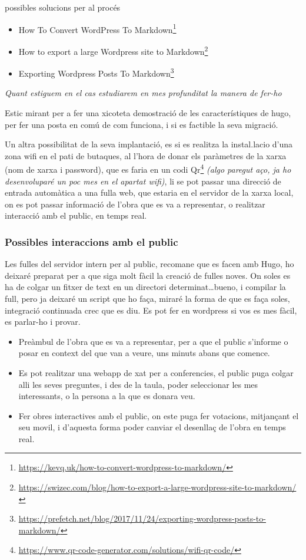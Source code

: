 \documentclass[
  10pt,
]{krantz}
\DeclareRobustCommand{\href}[2]{#2\footnote{\url{#1}}}
\providecommand{\tightlist}{%
  \setlength{\itemsep}{0pt}\setlength{\parskip}{0pt}}
\begin{document}
possibles solucions per al procés

\begin{itemize}
\tightlist
\item
  \href{https://kevq.uk/how-to-convert-wordpress-to-markdown/}{How To Convert WordPress To Markdown}
\item
  \href{https://swizec.com/blog/how-to-export-a-large-wordpress-site-to-markdown/}{How to export a large Wordpress site to Markdown}
\item
  \href{https://prefetch.net/blog/2017/11/24/exporting-wordpress-posts-to-markdown/}{Exporting Wordpress Posts To Markdown}
\end{itemize}

\emph{Quant estiguem en el cas estudiarem en mes profunditat la manera de fer-ho}

Estic mirant per a fer una xicoteta demostració de les característiques de hugo, per fer una posta en comú de com funciona, i si es factible la seva migració.

Un altra possibilitat de la seva implantació, es si es realitza la instal.lacio d'una zona wifi en el pati de butaques, al l'hora de donar els paràmetres de la xarxa (nom de xarxa i password), que es faria en un codi \href{https://www.qr-code-generator.com/solutions/wifi-qr-code/}{Qr} \emph{(algo paregut aço, ja ho desenvoluparé un poc mes en el apartat wifi)}, li se pot passar una direcció de entrada automàtica a una fulla web, que estaria en el servidor de la xarxa local, on es pot passar informació de l'obra que es va a representar, o realitzar interacció amb el public, en temps real.

\hypertarget{possibles-interaccions-amb-el-public}{%
\subsubsection{Possibles interaccions amb el public}\label{possibles-interaccions-amb-el-public}}

Les fulles del servidor intern per al public, recomane que es facen amb Hugo, ho deixaré preparat per a que siga molt fàcil la creació de fulles noves. On soles es ha de colgar un fitxer de text en un directori determinat\ldots bueno, i compilar la full, pero ja deixaré un script que ho faça, miraré la forma de que es faça soles, integració continuada crec que es diu. Es pot fer en wordpress si vos es mes fàcil, es parlar-ho i provar.

\begin{itemize}
\item
  Preàmbul de l'obra que es va a representar, per a que el public s'informe o posar en context del que van a veure, uns minuts abans que comence.
\item
  Es pot realitzar una webapp de xat per a conferencies, el public puga colgar alli les seves preguntes, i des de la taula, poder seleccionar les mes interessants, o la persona a la que es donara veu.
\item
  Fer obres interactives amb el public, on este puga fer votacions, mitjançant el seu movil, i d'aquesta forma poder canviar el desenllaç de l'obra en temps real.
\end{itemize}
\end{document}
